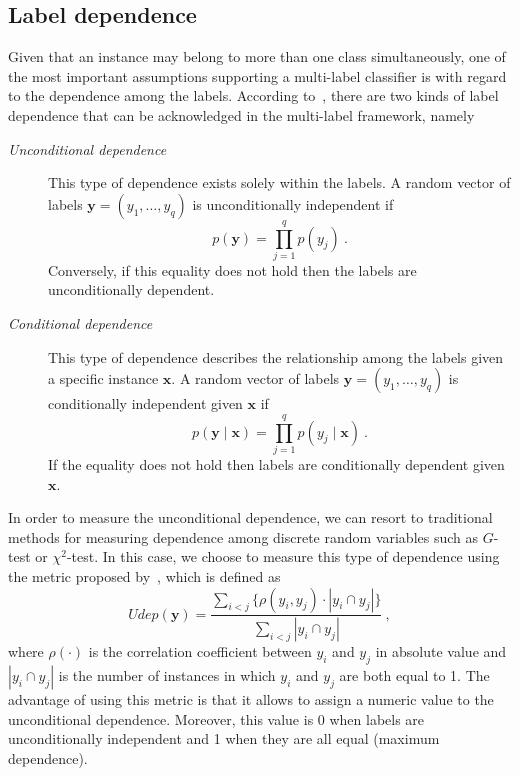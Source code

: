 \documentclass[review]{elsarticle}
\begin{document}
\subsection{Label dependence}

Given that an instance may belong to more than one class simultaneously, one of the most important assumptions supporting a multi-label classifier is with regard to the dependence among the labels. According to~\citet{EG1}, there are two kinds of label dependence that can be acknowledged in the multi-label framework, namely
\begin{description}
	\item[\it Unconditional dependence] This type of dependence exists solely within the labels. A random vector of labels $\mathbf{y} = \left(y_{1},\ldots,y_{q} \right)$ is unconditionally independent if
	\begin{equation} \label{UDEP}
		p(\mathbf{y}) = \prod^{q}_{j=1}{p(y_{j})}\ .
	\end{equation}
	Conversely, if this equality does not hold then the labels are unconditionally dependent.
	\item[\it Conditional dependence] This type of dependence describes the relationship among the labels given a specific instance $\mathbf{x}$. A random vector of labels $\mathbf{y} = \left(y_{1},\ldots,y_{q} \right)$ is conditionally independent given $\mathbf{x}$ if
	\begin{equation} \label{CDEP}
		p(\mathbf{y}\mid\mathbf{x}) = \prod^{q}_{j=1}{p(y_{j}\mid\mathbf{x})}\ .
	\end{equation}
	If the equality does not hold then labels are conditionally dependent given $\mathbf{x}$.
\end{description}

In order to measure the unconditional dependence, we can resort to traditional methods for measuring dependence among discrete random variables such as $G$-test or $\chi^{2}$-test. In this case, we choose to measure this type of dependence using the metric proposed by~\citet{MLG1}, which is defined as
\begin{equation}
Udep(\mathbf{y}) = \frac{\sum_{i < j}\{\rho \left( {y}_{i}, {y}_{j} \right) \cdot | {y}_{i} \cap {y}_{j} |\}}{\sum_{i < j}{| {y}_{i} \cap {y}_{j} |}}\ ,
\end{equation}
where $\rho(\cdot)$ is the correlation coefficient between ${y}_{i}$ and ${y}_{j}$ in absolute value and $| {y}_{i} \cap {y}_{j} |$ is the number of instances in which $y_{i}$ and $y_{j}$ are both equal to 1. The advantage of using this metric is that it allows to assign a numeric value to the unconditional dependence. Moreover, this value is 0 when labels are unconditionally independent and 1 when they are all equal (maximum dependence).
\end{document}

